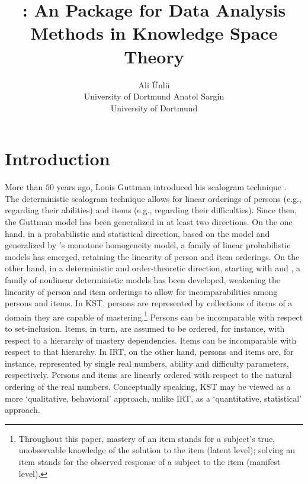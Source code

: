 \documentclass[nojss]{jss}
\author{Ali \"Unl\"u\\University of Dortmund \And 
        Anatol Sargin\\University of Dortmund}
\title{\pkg{DAKS}: An \proglang{R} Package for Data Analysis Methods in Knowledge Space Theory}
\begin{document}


\section{Introduction}
\label{Intro}

More than $50$ years ago, Louis Guttman introduced his scalogram technique 
\citep{Guttm:44}. 
The deterministic scalogram technique allows for linear orderings of persons 
(e.g., regarding their abilities) and items (e.g., regarding their difficulties).
Since then, the Guttman model has been generalized in at least two directions.
On the one hand, in a probabilistic and statistical direction, 
based on the \cite{Rasch:60} model and generalized 
by \cite{Mokk:71}'s monotone homogeneity model, a family of linear probabilistic models 
\citep[item response theory, IRT; e.g.,][]{LindHamb:97}
has emerged, retaining the linearity of person and item orderings. 
On the other hand, in a deterministic and order-theoretic direction, 
starting with \cite{AirBart:73} and \cite{BartKrus:73}, 
a family of nonlinear deterministic models 
\citep[knowledge space theory, KST; e.g.,][see Section \ref{KST}]{DF:85}
has been developed, 
weakening the linearity of person and item orderings to allow for incomparabilities 
among persons and items.
In KST, persons are represented by collections of items of a domain they
are capable of mastering.\footnote{Throughout this paper, mastery 
of an item stands for a subject's true, unobservable knowledge of the solution to the item 
(latent level); solving an item stands for the observed response of a subject to the item 
(manifest level).} 
Persons can be incomparable with respect to set-inclusion. 
Items, in turn, are assumed to be ordered, for instance, 
with respect to a hierarchy of mastery dependencies. 
Items can be incomparable with respect to that hierarchy. 
In IRT, on the other hand, persons and items are, for
instance, represented by single real numbers, ability and difficulty parameters,
respectively. Persons and items are linearly ordered with respect
to the natural ordering of the real numbers. Conceptually speaking, KST
may be viewed as a more `qualitative, behavioral' approach, unlike IRT, as a
`quantitative, statistical' approach. 
\end{document}

